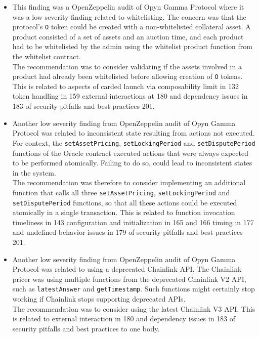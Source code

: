 \begin{itemize}
\item
  This finding was a OpenZeppelin audit of Opyn Gamma Protocol where it
  was a low severity finding related to whitelisting. The concern was
  that the protocol's \texttt{O} token could be created with a
  non-whitelisted collateral asset. A product consisted of a set of
  assets and an auction time, and each product had to be whitelisted by
  the admin using the whitelist product function from the whitelist
  contract.\\

  The recommendation was to consider validating if the assets involved
  in a product had already been whitelisted before allowing creation of
  \texttt{O} tokens. This is related to aspects of carded launch via
  composability limit in 132 token handling in 159 external interactions
  at 180 and dependency issues in 183 of security pitfalls and best
  practices 201.
\item
  Another low severity finding from OpenZeppelin audit of Opyn Gamma
  Protocol was related to inconsistent state resulting from actions not
  executed. For context, the \texttt{setAssetPricing},
  \texttt{setLockingPeriod} and \texttt{setDisputePeriod} functions of
  the Oracle contract executed actions that were always expected to be
  performed atomically. Failing to do so, could lead to inconsistent
  states in the system.\\

  The recommendation was therefore to consider implementing an
  additional function that calls all three \texttt{setAssetPricing},
  \texttt{setLockingPeriod} and \texttt{setDisputePeriod} functions, so
  that all these actions could be executed atomically in a single
  transaction. This is related to function invocation timeliness in 143
  configuration and initialization in 165 and 166 timing in 177 and
  undefined behavior issues in 179 of security pitfalls and best
  practices 201.
\item
  Another low severity finding from OpenZeppelin audit of Opyn Gamma
  Protocol was related to using a deprecated Chainlink API. The
  Chainlink pricer was using multiple functions from the deprecated
  Chainlink V2 API, such as \texttt{latestAnswer} and
  \texttt{getTimestamp}. Such functions might certainly stop working if
  Chainlink stops supporting deprecated APIs.\\

  The recommendation was to consider using the latest Chainlink V3 API.
  This is related to external interaction in 180 and dependency issues
  in 183 of security pitfalls and best practices to one body.
\end{itemize}

